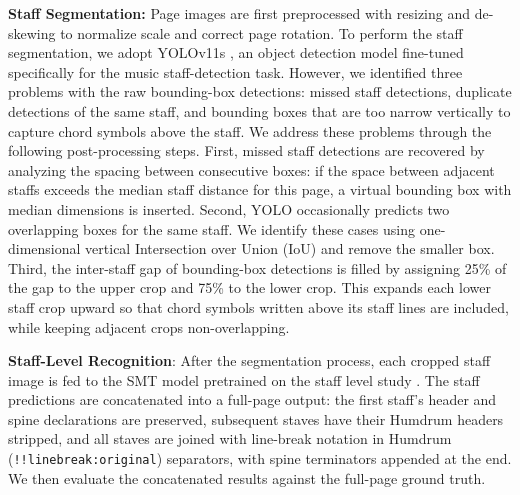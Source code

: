 \documentclass{article}
\begin{document}
\textbf{Staff Segmentation:}
Page images are first preprocessed with resizing and de-skewing to normalize scale and correct page rotation.
To perform the staff segmentation, we adopt YOLOv11s \cite{dvorak2024staff}, an object detection model fine-tuned specifically for the music staff-detection task. However, we identified three problems with the raw bounding-box detections: %
missed staff detections, duplicate detections of the same staff, and bounding boxes that are too narrow vertically to capture chord symbols above the staff. We address these problems through the following post-processing steps. %
First, missed staff detections are recovered by analyzing the spacing between consecutive boxes: if the space between adjacent staffs exceeds the median staff distance for this page, a virtual bounding box with median dimensions is inserted. 
Second, YOLO occasionally predicts two overlapping boxes for the same staff. We identify these cases using one-dimensional vertical Intersection over Union (IoU) \cite{yu2016unitbox} and remove the smaller box. %
Third, the inter-staff gap of bounding-box detections is filled by %
assigning 25\% of the gap to the upper crop and 75\% to the lower crop. This expands each lower staff crop upward so that chord symbols written above its staff lines are included, while keeping adjacent crops non-overlapping.

\textbf{Staff-Level Recognition}:
After the segmentation process, each cropped staff image is fed to the SMT model pretrained on the staff level study \cite{martinez-sevilla_optical_2025}. The staff predictions are concatenated into a full-page output: the first staff's header and spine declarations are preserved, subsequent staves have their Humdrum headers stripped, and all staves are joined with line-break notation in Humdrum (\texttt{!!linebreak:original}) separators, with spine terminators appended at the end. We then evaluate the concatenated results against the full-page ground truth.
\end{document}

